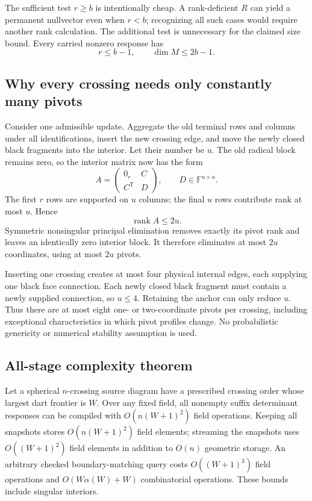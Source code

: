 The sufficient test $r\ge b$ is intentionally cheap.  A rank-deficient
$R$ can yield a permanent nullvector even when $r<b$; recognizing all
such cases would require another rank calculation.  The additional test
is unnecessary for the claimed size bound.  Every carried nonzero
response has
\[
                      r\le b-1,\qquad \dim M\le 2b-1.
\]

\subsection{Why every crossing needs only constantly many pivots}

Consider one admissible update.  Aggregate the old terminal rows and
columns under all identifications, insert the new crossing edge, and
move the newly closed black fragments into the interior.  Let their
number be $u$.  The old radical block remains zero, so the interior
matrix now has the form
\[
 A=\begin{pmatrix}0_r&C\\C^{\mathsf T}&D\end{pmatrix},
                     \qquad D\in\mathbb F^{u\times u}.
\]
The first $r$ rows are supported on $u$ columns; the final $u$ rows
contribute rank at most $u$.  Hence
\[
                         \operatorname{rank}A\le 2u.
\]
Symmetric nonsingular principal elimination removes exactly its pivot
rank and leaves an identically zero interior block.  It therefore
eliminates at most $2u$ coordinates, using at most $2u$ pivots.

Inserting one crossing creates at most four physical internal edges,
each supplying one black face connection.  Each newly closed black
fragment must contain a newly supplied connection, so $u\le4$.
Retaining the anchor can only reduce $u$.  Thus there are at most eight
one- or two-coordinate pivots per crossing, including exceptional
characteristics in which pivot profiles change.  No probabilistic
genericity or numerical stability assumption is used.

\subsection{All-stage complexity theorem}

\begin{theorem}
\label{thm:response-all-stage}
Let a spherical $n$-crossing source diagram have a prescribed crossing
order whose largest dart frontier is $W$.  Over any fixed field, all
nonempty suffix determinant responses can be compiled with
$O(n(W+1)^2)$ field operations.  Keeping all snapshots stores
$O(n(W+1)^2)$ field elements; streaming the snapshots uses
$O((W+1)^2)$ field elements in addition to $O(n)$ geometric storage.
An arbitrary checked boundary-matching query costs
$O((W+1)^3)$ field operations and $O(W\alpha(W)+W)$ combinatorial
operations.  These bounds include singular interiors.
\end{theorem}

